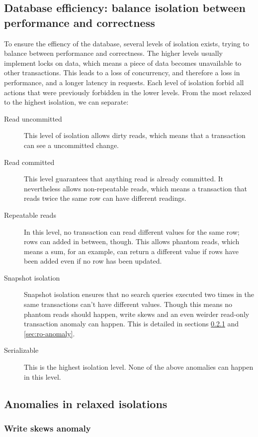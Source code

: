 \subsection{Database efficiency: balance isolation between performance and correctness}
\label{sec:isolation}
To ensure the effiency of the database, several levels of isolation exists, trying to balance between performance and correctness. The higher levels usually implement locks on data, which means a piece of data becomes unavailable to other transactions. This leads to a loss of concurrency, and therefore a loss in performance, and a longer latency in requests. Each level of isolation forbid all actions that were previously forbidden in the lower levels.
From the most relaxed to the highest isolation, we can separate:
\begin{description}
\item[Read uncommitted] This level of isolation allows dirty reads, which means that a transaction can see a uncommitted change.
\item[Read committed] This level guarantees that anything read is already committed. It nevertheless allows non-repeatable reads, which means a transaction that reads twice the same row can have different readings.
\item[Repeatable reads] In this level, no transaction can read different values for the same row; rows can added in between, though. This allows phantom reads, which means a sum, for an example, can return a different value if rows have been added even if no row has been updated.
\item[Snapshot isolation] Snapshot isolation ensures that no search queries executed two times in the same transactions can't have different values. Though this means no phantom reads should happen, write skews and an even weirder read-only transaction anomaly can happen. This is detailed in sections \ref{sec:ws} and \ref{sec:ro-anomaly}.
\item[Serializable] This is the highest isolation level. None of the above anomalies can happen in this level.
\end{description}

\subsection{Anomalies in relaxed isolations}

\subsubsection{Write skews anomaly}
\label{sec:ws}

